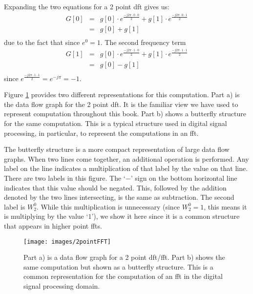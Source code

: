 Expanding the two equations for a 2 point \gls{dft} gives us:
\begin{equation}
\begin{array} {lll} 
G[0] & = & g[0] \cdot e^{\frac{-j 2 \pi \cdot 0 \cdot 0}{2}} + g[1] \cdot e^{\frac{-j 2 \pi \cdot 0 \cdot 1}{2}} \\
 & = & g[0] + g[1] \\
\end{array}
\label{eq:2ptlower}
\end{equation} due to the fact that since  $e^{0}  =  1$. The second frequency term
\begin{equation}
\begin{array} {lll} 
G[1] & = & g[0] \cdot e^{\frac{-j 2 \pi \cdot 1 \cdot 0}{2}} + g[1] \cdot e^{\frac{-j 2 \pi \cdot 1 \cdot 1}{2}} \\
 & = & g[0] - g[1] \\
\end{array}
\label{eq:2pthigher}
\end{equation} since  $e^{\frac{-j 2 \pi \cdot 1 \cdot 1}{2}}  = e^{-j \pi } = -1$.

Figure \ref{fig:2pointFFT} provides two different representations for this computation.  Part a) is the data flow graph for the 2 point \gls{dft}. It is the familiar view we have used to represent computation throughout this book. Part b) shows a butterfly structure for the same computation. This is a typical structure used in digital signal processing, in particular, to represent the computations in an \gls{fft}. 

The butterfly structure is a more compact representation of large data flow graphs. When two lines come together, an additional operation is performed. Any label on the line indicates a multiplication of that label by the value on that line. There are two labels in this figure. The `$-$' sign on the bottom horizontal line indicates that this value should be negated. This, followed by the addition denoted by the two lines intersecting, is the same as subtraction. The second label is $W^0_2$. While this multiplication is unnecessary (since $W^0_2 = 1$, this means it is multiplying by the value `$1$'), we show it here since it is a common structure that appears in higher point \gls{fft}s.

\begin{figure}
\centering
\texttt{[image: images/2pointFFT]}
\caption{Part a) is a data flow graph for a 2 point \gls{dft}/\gls{fft}. Part b) shows the same computation but shown as a butterfly structure. This is a common representation for the computation of an \gls{fft} in the digital signal processing domain.}
\label{fig:2pointFFT}
\end{figure}

